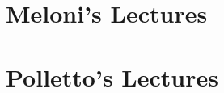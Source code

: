 \documentclass[11pt, a4paper, twoside, openright]{book}
\begin{document}
%
%
%
%
%
%






\mainmatter
\pagestyle{fancy}

\part{Meloni's Lectures}




\part{Polletto's Lectures}

\backmatter
\pagestyle{plain}



\end{document}
